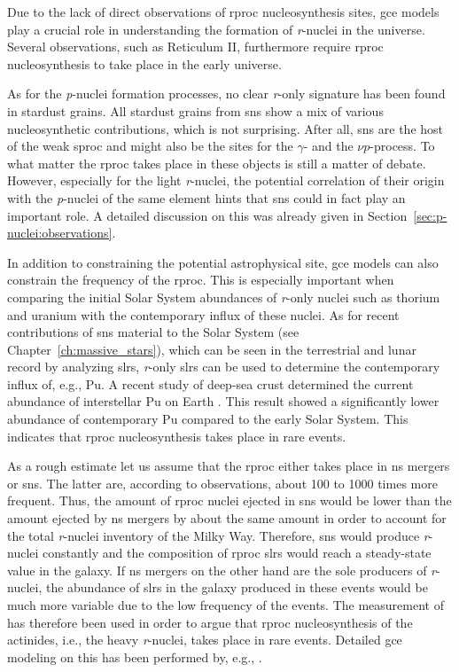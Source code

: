 Due to the lack of direct observations of \ac{rproc} nucleosynthesis sites, \ac{gce} models play a crucial role in understanding the formation of \textit{r}-nuclei in the universe. Several observations, such as Reticulum II, furthermore require \ac{rproc} nucleosynthesis to take place in the early universe. 

As for the \textit{p}-nuclei formation processes, no clear \textit{r}-only signature has been found in stardust grains. All stardust grains from \acp{sn} show a mix of various nucleosynthetic contributions, which is not surprising. After all, \acp{sn} are the host of the weak \ac{sproc} and might also be the sites for the $\gamma$- and the $\nu p$-process. To what matter the \ac{rproc} takes place in these objects is still a matter of debate. However, especially for the light \textit{r}-nuclei, the potential correlation of their origin with the \textit{p}-nuclei of the same element hints that \acp{sn} could in fact play an important role. A detailed discussion on this was already given in Section~\ref{sec:p-nuclei:observations}.

In addition to constraining the potential astrophysical site, \ac{gce} models can also constrain the frequency of the \ac{rproc}. This is especially important when comparing the initial Solar System abundances of \textit{r}-only nuclei such as thorium and uranium with the contemporary influx of these nuclei. As for recent contributions of \acp{sn} material to the Solar System (see Chapter~\ref{ch:massive_stars}), which can be seen in the terrestrial and lunar record by analyzing \acp{slr}, \textit{r}-only \acp{slr} can be used to determine the contemporary influx of, e.g., Pu. A recent study of deep-sea crust determined the current abundance of interstellar Pu on Earth \citep{wallner15}. This result showed a significantly lower abundance of contemporary Pu compared to the early Solar System. This indicates that \ac{rproc} nucleosynthesis takes place in rare events.

As a rough estimate let us assume that the \ac{rproc} either takes place in \ac{ns} mergers or \acp{sn}. The latter are, according to observations, about 100 to 1000 times more frequent. Thus, the amount of \ac{rproc} nuclei ejected in \acp{sn} would be lower than the amount ejected by \ac{ns} mergers by about the same amount in order to account for the total \textit{r}-nuclei inventory of the Milky Way. Therefore, \acp{sn} would produce \textit{r}-nuclei constantly and the composition of \ac{rproc} \acp{slr} would reach a steady-state value in the galaxy. If \ac{ns} mergers on the other hand are the sole producers of \textit{r}-nuclei, the abundance of \acp{slr} in the galaxy produced in these events would be much more variable due to the low frequency of the events. The measurement of \citet{wallner15} has therefore been used in order to argue that \ac{rproc} nucleosynthesis of the actinides, i.e., the heavy \textit{r}-nuclei, takes place in rare events. Detailed \ac{gce} modeling on this has been performed by, e.g., \citet{bartos19}.


